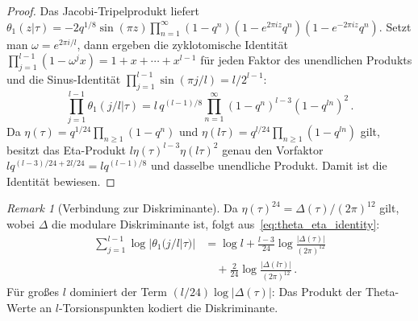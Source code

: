 \documentclass[aps,prd,twocolumn,superscriptaddress,nofootinbib,floatfix]{revtex4-2}
\theoremstyle{definition}
\theoremstyle{remark}
\newtheorem{remark}[theorem]{Remark}
\begin{document}
\begin{proof}
Das Jacobi-Tripelprodukt liefert $\theta_1(z|\tau)=-2q^{1/8}\sin(\pi z)\prod_{n=1}^{\infty}(1-q^n)(1-e^{2\pi iz}q^n)(1-e^{-2\pi iz}q^n)$.
Setzt man $\omega=e^{2\pi i/l}$, dann ergeben die zyklotomische Identität $\prod_{j=1}^{l-1}(1-\omega^jx)=1+x+\cdots+x^{l-1}$ für jeden Faktor des unendlichen Produkts und die Sinus-Identität $\prod_{j=1}^{l-1}\sin(\pi j/l)=l/2^{l-1}$:
\[
\prod_{j=1}^{l-1}\theta_1(j/l|\tau)
= l\,q^{(l-1)/8}
\prod_{n=1}^{\infty}(1-q^n)^{l-3}(1-q^{ln})^2\,.
\]
Da $\eta(\tau)=q^{1/24}\prod_{n\geq1}(1-q^n)$ und $\eta(l\tau)=q^{l/24}\prod_{n\geq1}(1-q^{ln})$ gilt, besitzt das Eta-Produkt $l\eta(\tau)^{l-3}\eta(l\tau)^2$ genau den Vorfaktor $lq^{(l-3)/24+2l/24}=lq^{(l-1)/8}$ und dasselbe unendliche Produkt. Damit ist die Identität bewiesen.
\end{proof}

\begin{remark}[Verbindung zur Diskriminante]
\label{rem:theta_discriminant}
Da $\eta(\tau)^{24}=\Delta(\tau)/(2\pi)^{12}$ gilt, wobei $\Delta$ die modulare Diskriminante ist, folgt aus~\eqref{eq:theta_eta_identity}:
\begin{equation}
\begin{aligned}
\sum_{j=1}^{l-1}\log|\theta_1(j/l|\tau)|
&= \log l
 + \frac{l-3}{24}\log\frac{|\Delta(\tau)|}{(2\pi)^{12}} \\
&\quad + \frac{2}{24}\log\frac{|\Delta(l\tau)|}{(2\pi)^{12}}\,.
\end{aligned}
\label{eq:theta_log_discriminant}
\end{equation}
Für großes $l$ dominiert der Term $(l/24)\log|\Delta(\tau)|$: Das Produkt der Theta-Werte an $l$-Torsionspunkten kodiert die Diskriminante.
\end{remark}
\end{document}
